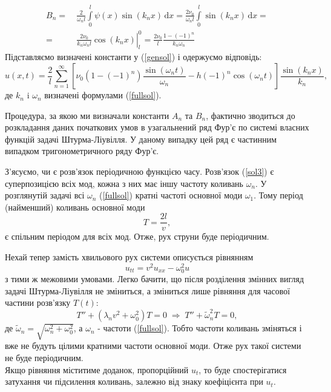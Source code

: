 \begin{equation*}
    \begin{aligned}
        B_n =&\ \frac{2}{\omega_n l} \int\limits_0^l \psi(x) \sin(k_n x) \,\mathrm{d}x = \frac{2\nu_0}{\omega_n l} \int\limits_0^l \sin(k_n x) \,\mathrm{d}x =\\
        =&\ \left.\frac{2\nu_0}{k_n\omega_n l} \cos(k_n x)\right|_l^0 = \frac{2\nu_0}{l} \frac{1 - (-1)^n}{k_n\omega_n}
    \end{aligned}
\end{equation*}
Підставляємо визначені константи у (\ref{gensol}) і одержуємо відповідь:
\begin{equation} \label{sol3}
    u(x,t) = \frac{2}{l}\sum^{\infty}_{n=1} \left[\nu_0 (1 - (-1)^n)\frac{\sin(\omega_n t)}{\omega_n} - h(-1)^n\cos(\omega_n t)\right] \frac{\sin(k_n x)}{k_n},
\end{equation}
де $k_n$ i $\omega_n$ визначені формулами (\ref{fullsol}).

Процедура, за якою ми визначали константи $A_n$ та $B_n$, фактично зводиться до розкладання даних початкових умов в узагальнений ряд Фур'є по системі власних функцій задачі Штурма-Ліувілля. У даному випадку цей ряд є частинним випадком тригонометричного ряду Фур'є. 

З'ясуємо, чи є розв'язок періодичною функцією часу. Розв'язок (\ref{sol3}) є суперпозицією всіх мод, кожна з них має іншу частоту коливань $\omega_n$. У розглянутій задачі  всі $\omega_n$ (\ref{fullsol}) кратні частоті основної моди $\omega_1$. Тому період (найменший) коливань основної моди \[T = \frac{2l}{v},\] є спільним періодом для всіх мод. Отже, рух струни буде періодичним. 

Нехай тепер замість хвильового рух системи описується рівнянням \[u_{tt} = v^2 u_{xx} - \omega_0^2 u\] з тими ж межовими умовами. Легко бачити, що після розділення змінних вигляд задачі Штурма-Ліувілля не зміниться, а зміниться лише рівняння для часової частини розв'язку $T(t)$:
\begin{equation}
    T'' + (\lambda_n v^2 + \omega_0^2) T = 0
    \;\Rightarrow\; 
    T'' + \widetilde{\omega}_n^2 T = 0,
\end{equation}
де $\widetilde{\omega}_n = \sqrt{\omega_n^2 + \omega_0^2}$, а $\omega_n$ - частоти (\ref{fullsol}). Тобто частоти коливань зміняться і вже не будуть цілими кратними частоти основної моди. Отже рух такої системи не буде періодичним.\\
Якщо рівняння міститиме доданок, пропорційний $u_t$, то буде спостерігатися затухання чи підсилення коливань, залежно від знаку коефіцієнта при $u_t$.

%